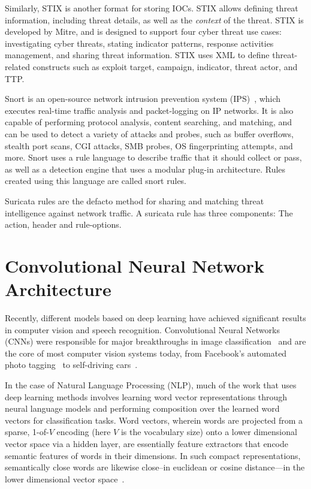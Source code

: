 Similarly, STIX is another format for storing IOCs. STIX allows defining threat information, including threat details, as well as the \emph{context} of the threat. STIX is developed by Mitre, and is designed to support four cyber threat use cases: investigating cyber threats, stating indicator patterns, response activities management, and sharing threat information. STIX uses XML to define threat-related constructs such as exploit target, campaign, indicator, threat actor, and TTP.

Snort is an open-source network intrusion prevention system (IPS)~\cite{sekar}, which  executes real-time traffic analysis and packet-logging on IP networks. It is also capable of performing protocol analysis, content searching, and matching, and can be used to detect a variety of attacks and probes, such as buffer overflows, stealth port scans, CGI attacks, SMB probes, OS fingerprinting attempts, and more. Snort uses a rule language to describe traffic that it should collect or pass, as well as a detection engine that uses a modular plug-in architecture. Rules created using this language are called snort rules.

Suricata rules are the defacto method for sharing and matching threat intelligence against network traffic. A suricata rule has three components: The action, header and rule-options.


\section{Convolutional Neural Network Architecture} \label{cnn}

Recently, different models based on deep learning have achieved significant results in computer vision and speech recognition. Convolutional Neural Networks (CNNs) were responsible for major breakthroughs in image classification~\cite{krizhevsky} and are the core of most computer vision systems today, from Facebook's automated photo tagging~\cite{stone} to self-driving cars~\cite{bojarski}. 

In the case of Natural Language Processing (NLP), much of the work that uses deep learning methods involves learning word vector representations through neural language models and performing composition over the learned word vectors for classification tasks. Word vectors, wherein words are projected from a sparse, 1-of-$V$ encoding (here $V$ is the vocabulary size) onto a lower dimensional vector space via a hidden layer, are essentially feature extractors that encode semantic features of words in their dimensions. In such compact representations, semantically close words are likewise close--in euclidean or cosine distance---in the lower dimensional vector space~\cite{mikolov}.

